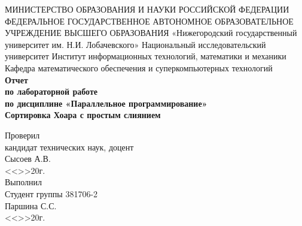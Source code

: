 \documentclass[14pt,a4paper]{extreport}
\begin{document}
	\begin{titlepage}
		\center 
		МИНИСТЕРСТВО ОБРАЗОВАНИЯ И НАУКИ РОССИЙСКОЙ ФЕДЕРАЦИИ
		ФЕДЕРАЛЬНОЕ ГОСУДАРСТВЕННОЕ АВТОНОМНОЕ ОБРАЗОВАТЕЛЬНОЕ УЧРЕЖДЕНИЕ ВЫСШЕГО ОБРАЗОВАНИЯ
		\linebreak  
		«Нижегородский государственный университет им. Н.И. Лобачевского»
		\linebreak  
		Национальный исследовательский университет
		\linebreak  
		Институт информационных технологий, математики и механики
		\linebreak  
		Кафедра математического обеспечения и суперкомпьютерных технологий\\[2.5cm]
		
		{\huge \bfseries Отчет \\[0.1cm]
			\Large \mdseries по лабораторной работе \\[0,1cm]
			\Large \mdseries по дисциплине «Параллельное программирование» \\[1cm]
			\Large \bfseries Сортировка Хоара с простым слиянием}\\[3cm]
		
		\begin{flushright} \large
			{Проверил} \\[0.1cm]
			{кандидат технических наук, доцент}\\[0.1cm]
			{\underline{\hspace{2,35in}} Сысоев А.В.}\\[0.1cm]
			{<<\underline{\hspace{0,25in}}>>\underline{\hspace{2,55in}}20\underline{\hspace{0,3in}}г.} \\[0.1cm]
			{Выполнил} \\[0.1cm]
			{Студент группы 381706-2} \\[0.1cm]
			{\underline{\hspace{2,1in}} Паршина С.С.} \\[0.1cm]
			{<<\underline{\hspace{0,25in}}>>\underline{\hspace{2,55in}}20\underline{\hspace{0,3in}}г.} \\[3cm]
		\end{flushright}
		
	\end{titlepage}
	
\end{document}
